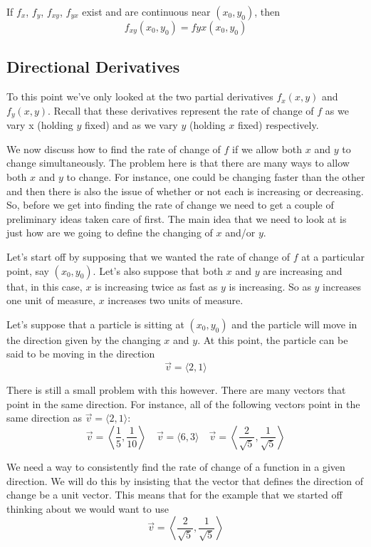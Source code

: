 \begin{thrm}{}{}
If $f_x$, $f_y$, $f_{xy}$, $f_{yx}$ exist and are continuous near $(x_0, y_0)$, then
\[ f_{xy}(x_0, y_0) = fyx(x_0, y_0) \]
\end{thrm}

\subsection{Directional Derivatives}
To this point we've only looked at the two partial derivatives $f_x(x,y)$ and $f_y(x,y)$. Recall that these derivatives represent the rate of change of $f$ as we vary x (holding $y$ fixed) and as we vary $y$ (holding $x$ fixed) respectively. 

We now discuss how to find the rate of change of $f$ if we allow both $x$ and $y$ to change simultaneously. The problem here is that there are many ways to allow both $x$ and $y$ to change. For instance, one could be changing faster than the other and then there is also the issue of whether or not each is increasing or decreasing. So, before we get into finding the rate of change we need to get a couple of preliminary ideas taken care of first. The main idea that we need to look at is just how are we going to define the changing of $x$ and/or $y$.

Let's start off by supposing that we wanted the rate of change of $f$ at a particular point, say $(x_0,y_0)$. Let's also suppose that both $x$ and $y$ are increasing and that, in this case, $x$ is increasing twice as fast as $y$ is increasing. So as $y$ increases one unit of measure, $x$ increases two units of measure.

Let's suppose that a particle is sitting at $(x_0,y_0)$ and the particle will move in the direction given by the changing 
$x$ and $y$. At this point, the particle can be said to be moving in the direction
\[ \vec{v} = \langle {2,1} \rangle \]

There is still a small problem with this however. There are many vectors that point in the same direction. For instance, all of the following vectors point in the same direction as $\vec v = \langle {2,1} \rangle$:
\[ \vec{v} = \left\langle {\frac{1}{5},\frac{1}{10}}\right\rangle \quad \vec{v} = \langle {6,3}\rangle \quad \vec{v} = \left\langle {\frac{2}{\sqrt{5}},\frac{1}{\sqrt{5}}}\right\rangle \]

We need a way to consistently find the rate of change of a function in a given direction. We will do this by insisting that the vector that defines the direction of change be a unit vector. This means that for the example that we started off thinking about we would want to use
\[ \vec{v} = \left\langle {\frac{2}{\sqrt{5}},\frac{1}{\sqrt{5}}}\right\rangle \]

